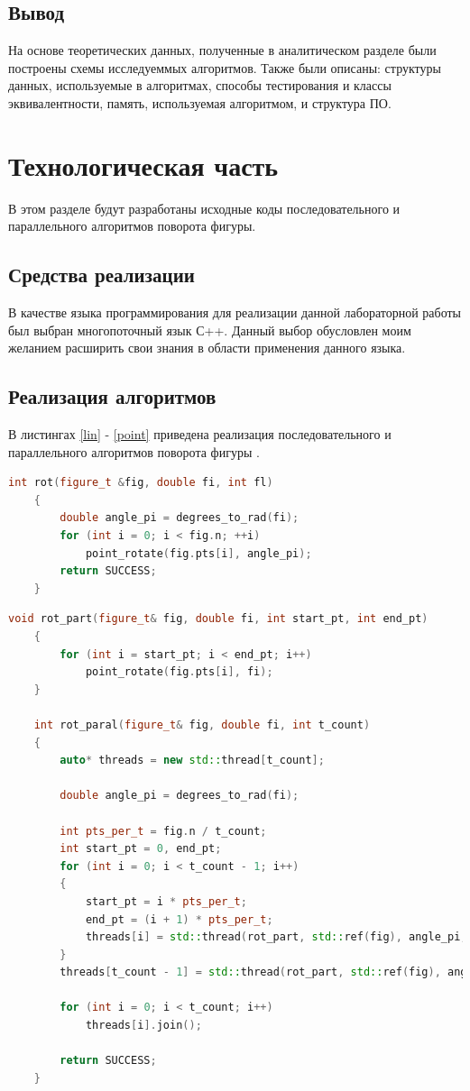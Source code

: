 \documentclass[12pt]{report}
\begin{document}
	\section{Вывод}
	На основе теоретических данных, полученные в аналитическом разделе были построены схемы исследуеммых алгоритмов. Также были описаны: структуры данных, используемые в алгоритмах, способы тестирования и классы эквивалентности, память, используемая алгоритмом, и структура ПО.
	
	\chapter{Технологическая часть}
	В этом разделе будут разработаны исходные коды последовательного и параллельного алгоритмов поворота фигуры.
	
	\section{Средства реализации}
	В качестве языка программирования для реализации данной лабораторной работы был выбран многопоточный язык С++. Данный выбор обусловлен моим желанием расширить свои знания в области применения данного языка.
	
	\section{Реализация алгоритмов}
	
	В листингах \ref{lin} - \ref{point} приведена реализация последовательного и параллельного алгоритмов поворота фигуры \cite{thread}.
	
	\begin{lstlisting}[label=lin,caption=Последовательный алгоритм поворота,language=C++]
	int rot(figure_t &fig, double fi, int fl)
	{
		double angle_pi = degrees_to_rad(fi);
		for (int i = 0; i < fig.n; ++i)
			point_rotate(fig.pts[i], angle_pi);
		return SUCCESS;
	}
	\end{lstlisting}

	\newpage
	
	\begin{lstlisting}[label=paral,caption=Параллельный алгоритм поворота,language=C++]
	void rot_part(figure_t& fig, double fi, int start_pt, int end_pt)
	{
		for (int i = start_pt; i < end_pt; i++)
			point_rotate(fig.pts[i], fi);
	}
	
	int rot_paral(figure_t& fig, double fi, int t_count)
	{
		auto* threads = new std::thread[t_count];
		
		double angle_pi = degrees_to_rad(fi);
		
		int pts_per_t = fig.n / t_count;
		int start_pt = 0, end_pt;
		for (int i = 0; i < t_count - 1; i++)
		{
			start_pt = i * pts_per_t;
			end_pt = (i + 1) * pts_per_t;
			threads[i] = std::thread(rot_part, std::ref(fig), angle_pi, start_pt, end_pt);
		}
		threads[t_count - 1] = std::thread(rot_part, std::ref(fig), angle_pi, (t_count - 1) * pts_per_t, fig.n);
		
		for (int i = 0; i < t_count; i++)
			threads[i].join();
		
		return SUCCESS;
	}
	\end{lstlisting}
	
\end{document}

